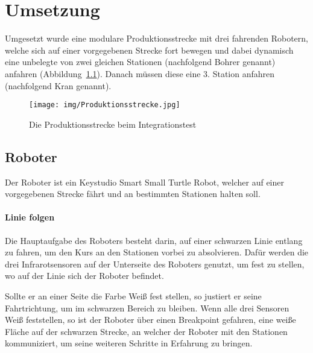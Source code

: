 \chapter{Umsetzung}
Umgesetzt wurde eine modulare Produktionsstrecke mit drei fahrenden Robotern, welche sich auf einer vorgegebenen Strecke fort bewegen und dabei dynamisch eine unbelegte von zwei gleichen Stationen (nachfolgend Bohrer genannt) anfahren (Abbildung~\ref{fig:strecke}). Danach müssen diese eine 3. Station anfahren (nachfolgend Kran genannt).
\begin{figure}[h]
\begin{center}
\texttt{[image: img/Produktionsstrecke.jpg]}
\caption{Die Produktionsstrecke beim Integrationstest}
\label{fig:strecke}
\end{center}
\end{figure}

\section{Roboter}
Der Roboter ist ein Keystudio Smart Small Turtle Robot, welcher auf einer vorgegebenen Strecke fährt und an bestimmten Stationen halten soll.
\subsubsection{Linie folgen}
Die Hauptaufgabe des Roboters besteht darin, auf einer schwarzen Linie entlang zu fahren, um den Kurs an den Stationen vorbei zu absolvieren. Dafür werden die drei Infrarotsensoren auf der Unterseite des Roboters genutzt, um fest zu stellen, wo auf der Linie sich der Roboter befindet.

Sollte er an einer Seite die Farbe Weiß fest stellen, so justiert er seine Fahrtrichtung, um im schwarzen Bereich zu bleiben. Wenn alle drei Sensoren Weiß feststellen, so ist der Roboter über einen Breakpoint gefahren, eine weiße Fläche auf der schwarzen Strecke, an welcher der Roboter mit den Stationen kommuniziert, um seine weiteren Schritte in Erfahrung zu bringen.

